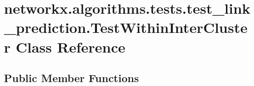 \hypertarget{classnetworkx_1_1algorithms_1_1tests_1_1test__link__prediction_1_1TestWithinInterCluster}{}\section{networkx.\+algorithms.\+tests.\+test\+\_\+link\+\_\+prediction.\+Test\+Within\+Inter\+Cluster Class Reference}
\label{classnetworkx_1_1algorithms_1_1tests_1_1test__link__prediction_1_1TestWithinInterCluster}
\subsection*{Public Member Functions}

